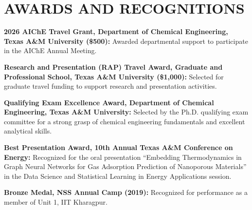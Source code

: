 \documentclass[11pt,letterpaper,sans]{moderncv}
\newenvironment{cvbodyblock}{\par\begingroup}{\par\endgroup}
\newcommand{\cvsection}[1]{\par\Needspace{3\baselineskip}\vspace{-0.3em}\section{#1}\vspace{-0.25em}}
\begin{document}
\cvsection{AWARDS AND RECOGNITIONS}
\begin{cvbodyblock}\small
\textbf{2026 AIChE Travel Grant, Department of Chemical Engineering, Texas A\&M University (\$500):} Awarded departmental support to participate in the AIChE Annual Meeting.\par\vspace{0.18em}
\textbf{Research and Presentation (RAP) Travel Award, Graduate and Professional School, Texas A\&M University (\$1,000):} Selected for graduate travel funding to support research and presentation activities.\par\vspace{0.18em}

\textbf{Qualifying Exam Excellence Award, Department of Chemical Engineering, Texas A\&M University:} Selected by the Ph.D. qualifying exam committee for a strong grasp of chemical engineering fundamentals and excellent analytical skills.\par\vspace{0.18em}
\textbf{Best Presentation Award, 10th Annual Texas A\&M Conference on Energy:} Recognized for the oral presentation ``Embedding Thermodynamics in Graph Neural Networks for Gas Adsorption Prediction of Nanoporous Materials'' in the Data Science and Statistical Learning in Energy Applications session.\par\vspace{0.18em}

\textbf{Bronze Medal, NSS Annual Camp (2019):} Recognized for performance as a member of Unit 1, IIT Kharagpur.\par\vspace{0.18em}
\end{cvbodyblock}
\end{document}
